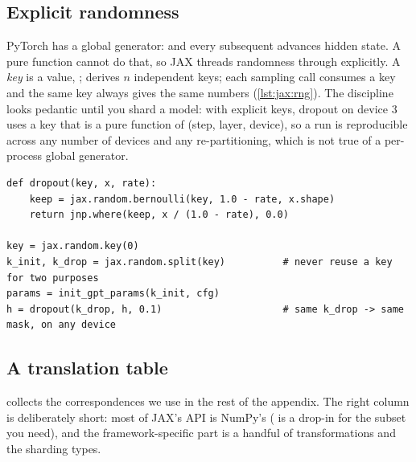 \subsection{Explicit randomness}
PyTorch has a global generator:  and every subsequent
 advances hidden state. A pure function cannot do that, so JAX threads
randomness through explicitly. A \emph{key} is a value, ;
 derives $n$ independent keys; each sampling call consumes a
key and the same key always gives the same numbers (\cref{lst:jax:rng}). The discipline looks
pedantic until you shard a model: with explicit keys, dropout on device 3 uses a key that is
a pure function of (step, layer, device), so a run is reproducible across any number of
devices and any re-partitioning, which is not true of a per-process global generator.

\begin{lstlisting}[caption={Explicit PRNG keys: dropout as a pure function of its key.},label={lst:jax:rng}]
def dropout(key, x, rate):
    keep = jax.random.bernoulli(key, 1.0 - rate, x.shape)
    return jnp.where(keep, x / (1.0 - rate), 0.0)

key = jax.random.key(0)
k_init, k_drop = jax.random.split(key)          # never reuse a key for two purposes
params = init_gpt_params(k_init, cfg)
h = dropout(k_drop, h, 0.1)                     # same k_drop -> same mask, on any device
\end{lstlisting}

\subsection{A translation table}
 collects the correspondences we use in the rest of the appendix. The
right column is deliberately short: most of JAX's API is NumPy's ( is a
drop-in for the subset you need), and the framework-specific part is a handful of
transformations and the sharding types.

